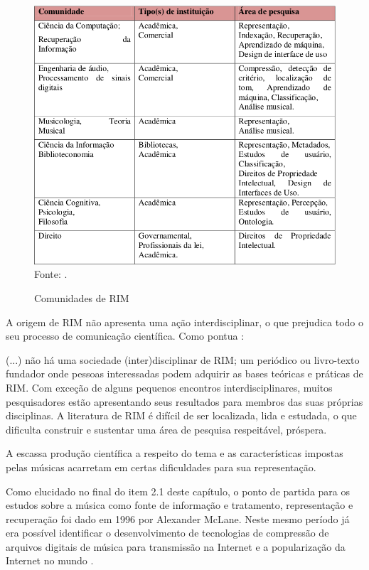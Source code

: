 \begin{figure}[!htb]
   \centering
   \caption{Comunidades de RIM}\label{fig:comunidadeRim} 
   \includegraphics[scale=0.6]{figuras/comunidadeRim.png}
   Fonte: \cite{futrelle&downie2002}.
\end{figure}

A origem de RIM não apresenta uma ação interdisciplinar, o que prejudica todo o seu processo de comunicação científica. Como pontua :

\begin{citacao}
(...) não há uma sociedade (inter)disciplinar de RIM; um periódico ou livro-texto fundador onde pessoas interessadas podem adquirir as bases teóricas e práticas de RIM. Com exceção de alguns pequenos encontros interdisciplinares, muitos pesquisadores estão apresentando seus resultados para membros das suas próprias disciplinas. A literatura de RIM é difícil de ser localizada, lida e estudada, o que dificulta construir e sustentar uma área de pesquisa respeitável, próspera.
\end{citacao}

A escassa produção científica a respeito do tema e as características impostas pelas músicas acarretam em certas dificuldades para sua representação.

Como elucidado no final do item 2.1 deste capítulo, o ponto de partida para os estudos sobre a música como fonte de informação e tratamento, representação e recuperação foi dado em 1996 por Alexander McLane. Neste mesmo período já era possível identificar o desenvolvimento de tecnologias de compressão de arquivos digitais de música para transmissão na Internet e a popularização da Internet no mundo \cite{santini&souza2007}.

